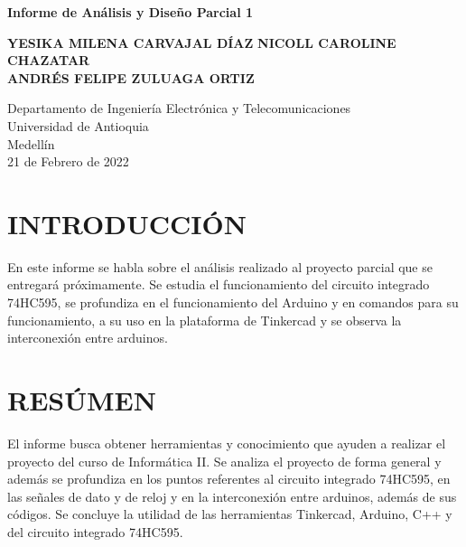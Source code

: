 \documentclass{article}
\begin{document}
\begin{titlepage}
    \begin{center}
        \vspace*{1cm}
            
        \Huge
        \textbf{Informe de Análisis y Diseño Parcial 1}
            
        \vspace{0.5cm}
        \LARGE
            
        \vspace{1.5cm}
            
        \textbf{YESIKA MILENA CARVAJAL DÍAZ}
        \textbf{NICOLL CAROLINE CHAZATAR}\\
        \textbf{ANDRÉS FELIPE ZULUAGA ORTIZ}
            
        \vfill
            
        \vspace{0.8cm}
            
        \Large
        Departamento de Ingeniería Electrónica y Telecomunicaciones\\
        Universidad de Antioquia\\
        Medellín\\
        21 de Febrero de 2022
            
    \end{center}
\end{titlepage}

\tableofcontents
\newpage

\section{INTRODUCCIÓN}
En este informe se habla sobre el análisis realizado al proyecto parcial que se entregará próximamente. Se estudia el funcionamiento del circuito integrado 74HC595, se profundiza en el funcionamiento del Arduino y en comandos para su funcionamiento, a su uso en la plataforma de Tinkercad y se observa la interconexión entre arduinos.

\section{RESÚMEN}
El informe busca obtener herramientas y conocimiento que ayuden a realizar el proyecto del curso de Informática II. Se analiza el proyecto de forma general y además se profundiza en los puntos referentes al circuito integrado 74HC595, en las señales de dato y de reloj y en la interconexión entre arduinos, además de sus códigos. Se concluye la utilidad de las herramientas Tinkercad, Arduino, C++ y del circuito integrado 74HC595.
\end{document}
